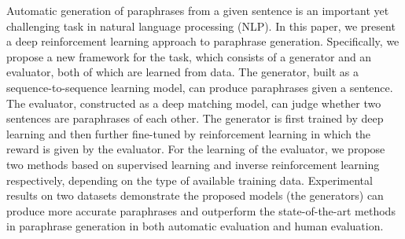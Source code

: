 Automatic generation of paraphrases from a given sentence is an important yet challenging task in natural language processing (NLP). In this paper, we present a deep reinforcement learning approach to paraphrase generation. Specifically, we propose a new framework for the task, which consists of a generator and an evaluator, both of which are learned from data. The generator, built as a sequence-to-sequence learning model, can produce paraphrases given a sentence. The evaluator, constructed as a deep matching model, can judge whether two sentences are paraphrases of each other. The generator is first trained by deep learning and then further fine-tuned by reinforcement learning in which the reward is given by the evaluator. For the learning of the evaluator, we propose two methods based on supervised learning and inverse reinforcement learning respectively, depending on the type of available training data. Experimental results on two datasets demonstrate the proposed models (the generators) can produce more accurate paraphrases and outperform the state-of-the-art methods in paraphrase generation in both automatic evaluation and human evaluation.
